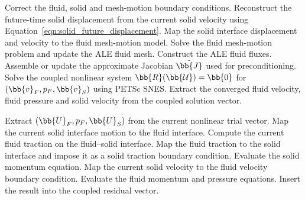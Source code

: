 \begin{algorithm}[htbp]
\caption{Quasi-monolithic FSI solution procedure for one time step}
\label{qm:alg:quasi_monolithic_fsi}
\begin{algorithmic}[1]
\State Correct the fluid, solid and mesh-motion boundary conditions.
\State Reconstruct the future-time solid displacement from the current solid
velocity using Equation~\eqref{eqn:solid_future_displacement}.
\State Map the solid interface displacement and velocity to the fluid
mesh-motion model.
\State Solve the fluid mesh-motion problem and update the ALE fluid mesh.
\State Construct the ALE fluid fluxes.
\State Assemble or update the approximate Jacobian $\tilde{\bb{J}}$ used for
preconditioning.
\State Solve the coupled nonlinear system
$\bb{R}(\bb{\mathcal{U}})=\bb{0}$ for
$(\bb{v}_F,p_F,\bb{v}_S)$ using PETSc SNES.
\State Extract the converged fluid velocity, fluid pressure and solid velocity
from the coupled solution vector.
\end{algorithmic}
\end{algorithm}

\begin{algorithm}[htbp]
\caption{Coupled residual evaluation}
\label{qm:alg:coupled_residual}
\begin{algorithmic}[1]
\State Extract $(\bb{U}_F,p_F,\bb{U}_S)$ from the current nonlinear trial vector.
\State Map the current solid interface motion to the fluid interface.
\State Compute the current fluid traction on the fluid--solid interface.
\State Map the fluid traction to the solid interface and impose it as a solid
traction boundary condition.
\State Evaluate the solid momentum equation.
\State Map the current solid velocity to the fluid velocity boundary condition.
\State Evaluate the fluid momentum and pressure equations.
\State Insert the result into the coupled residual vector.
\end{algorithmic}
\end{algorithm}


